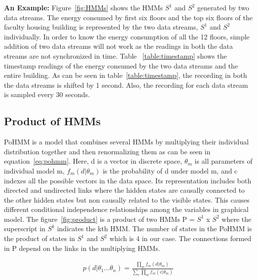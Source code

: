 \documentclass{acm_proc_article-sp}
\begin{document}
\noindent \textbf{An Example:} Figure~\ref{fig:HMMs} shows the HMMs $S^1$ and $S^2$ generated by two data streams. The energy consumed by first six floors and the top six floors of the faculty housing building is represented by the two data streams, $S^1$ and $S^2$ individually. In order to know the energy consumption of all the 12 floors, simple addition of two data streams will not work as the readings in both the data streams are not synchronized in time. Table ~\ref{table:timestamp} shows the timestamp readings of the energy consumed by the two data streams and the entire building. As can be seen in table~\ref{table:timestamp}, the recording in both the data streams is shifted by 1 second. Also, the recording for each data stream is sampled every 30 seconds.


\subsection{Product of HMMs}
\label {pohmm}
PoHMM is a model that combines several HMMs by multiplying their individual distribution together and then renormalizing them as can be seen in equation~\ref{eq:pohmm}. Here, d is a vector in discrete space, $\theta_{m}$ is all parameters of individual model m, $f_{m}(d | \theta_{m})$ is the probability of d under model m, and c indexes all the possible vectors in the data space. Its representation includes both directed and undirected links where the hidden states are causally connected to the other hidden states but non causally related to the visible states. This causes different conditional independence relationships among the variables in graphical model. 
The figure~\ref{fig:product} is a product of two HMMs P = $S^1$ x $S^2$ where the superscript in $S^k$ indicates the kth HMM. The number of states in the PoHMM is the product of states in $S^1$ and $S^2$ which is $4$ in our case. The connections formed in P depend on the links in the multiplying HMMs. 

\begin{eqnarray}
p(d|\theta_{1}...\theta_{n}) = \frac{\prod_{m}f_m(d|\theta_{m})}{\sum_{c}\prod_{m}f_m(c|\theta_{m})}
\label{eq:pohmm}
\end{eqnarray}
\end{document}
